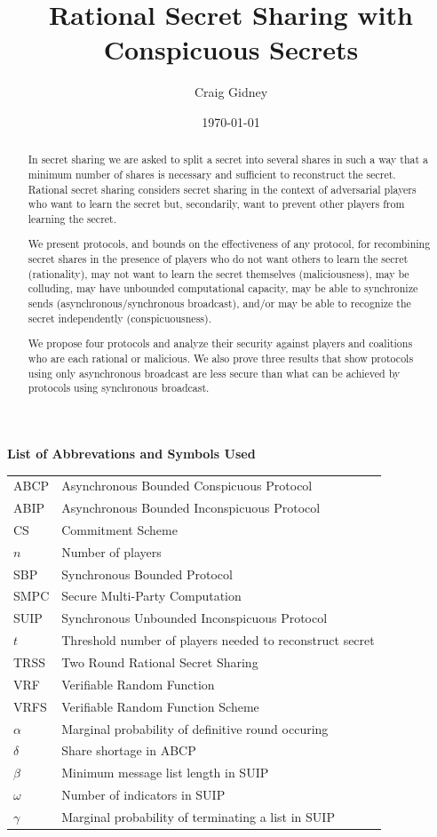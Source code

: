 \documentclass[12pt]{dalcsthesis}
\title{Rational Secret Sharing with Conspicuous Secrets}
\author{Craig Gidney}
\date{\today}
\begin{document}
\mcs
\nolistoftables
\frontmatter

\begin{abstract}
In secret sharing we are asked to split a secret into several shares in such a way that a minimum number of shares is necessary and sufficient to reconstruct the secret. Rational secret sharing considers secret sharing in the context of adversarial players who want to learn the secret but, secondarily, want to prevent other players from learning the secret. 

We present protocols, and bounds on the effectiveness of any protocol, for recombining secret shares in the presence of players who do not want others to learn the secret (rationality), may not want to learn the secret themselves (maliciousness), may be colluding, may have unbounded computational capacity, may be able to synchronize sends (asynchronous/synchronous broadcast), and/or may be able to recognize the secret independently (conspicuousness).

We propose four protocols and analyze their security against players and coalitions who are each rational or malicious. We also prove three results that show protocols using only asynchronous broadcast are less secure than what can be achieved by protocols using synchronous broadcast. 
\end{abstract}

\newpage
{}
{
\large \bfseries List of Abbrevations and Symbols Used \space
\par\nobreak
{}\baselineskip
}

\begin{tabular}{l l}
ABCP & Asynchronous Bounded Conspicuous Protocol \\
ABIP & Asynchronous Bounded Inconspicuous Protocol \\
CS & Commitment Scheme \\
$n$ & Number of players \\
SBP & Synchronous Bounded Protocol \\
SMPC & Secure Multi-Party Computation \\
SUIP & Synchronous Unbounded Inconspicuous Protocol \\
$t$ & Threshold number of players needed to reconstruct secret \\
TRSS & Two Round Rational Secret Sharing \\
VRF & Verifiable Random Function \\
VRFS & Verifiable Random Function Scheme \\
$\alpha$ & Marginal probability of definitive round occuring \\
$\delta$ & Share shortage in ABCP \\
$\beta$ & Minimum message list length in SUIP \\
$\omega$ & Number of indicators in SUIP \\
$\gamma$ & Marginal probability of terminating a list in SUIP
\end{tabular}
\end{document}
